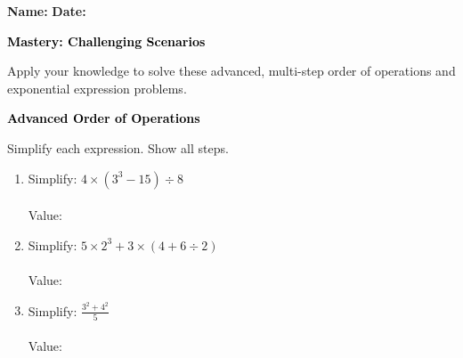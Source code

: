 \documentclass[12pt, letterpaper, fleqn]{article}
\newcommand{\blanklong}{\underline{\hspace{6.5cm}}}
\begin{document}
\textbf{Name:} \underline{\hspace{5cm}}
\hfill
\textbf{Date:} \underline{\hspace{3cm}}\\

\begin{tcolorbox}[colback=black!10]
    \large\textcolor{black}{\textbf{Mastery: Challenging Scenarios}}
\end{tcolorbox}

\vspace{3mm}
\noindent
Apply your knowledge to solve these advanced, multi-step order of operations and exponential expression problems.

\vspace{4mm}

\begin{tcolorbox}[colback=black!10]
\large\textcolor{black}{\textbf{Advanced Order of Operations}}
\end{tcolorbox}

\noindent
Simplify each expression. Show all steps.

\vspace{3mm}

\begin{enumerate}[itemsep=2.2cm, leftmargin=0.6cm]

\item Simplify: $4 \times (3^3 - 15) \div 8$ \\ \\
Value: \blanklong

\vspace{1cm}

\item Simplify: $5 \times 2^3 + 3 \times (4 + 6 \div 2)$ \\ \\
Value: \blanklong

\vspace{1cm}

\item Simplify: $\frac{3^2 + 4^2}{5}$ \\ \\
Value: \blanklong

\vspace{1cm}

\end{enumerate}
\end{document}
